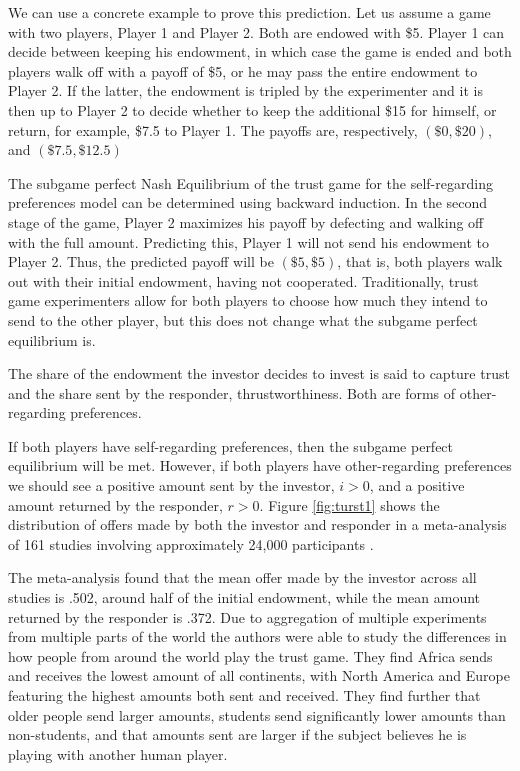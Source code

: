 \documentclass[12pt]{article}
\begin{document}
We can use a concrete example to prove this prediction. Let us assume a game with two players, Player 1 and Player 2. Both are endowed with \$5. Player 1 can decide between keeping his endowment, in which case the game is ended and both players walk off with a payoff of \$5, or he may pass the entire endowment to Player 2. If the latter, the endowment is tripled by the experimenter and it is then up to Player 2 to decide whether to keep the additional \$15 for himself, or return, for example, \$7.5 to Player 1. The payoffs are, respectively, $\left( \$ 0, \$20 \right)$, and  $\left( \$ 7.5, \$12.5 \right)$

The subgame perfect Nash Equilibrium of the trust game for the self-regarding preferences model can be determined using backward induction. In the second stage of the game, Player 2 maximizes his payoff by defecting and walking off with the full amount. Predicting this, Player 1 will not send his endowment to Player 2. Thus, the predicted payoff will be $\left (\$5,\$5 \right)$, that is, both players walk out with their initial endowment, having not cooperated. Traditionally, trust game experimenters allow for both players to choose how much they intend to send to the other player, but this does not change what the subgame perfect equilibrium is. 

The share of the endowment the investor decides to invest is said to capture trust and the share sent by the responder, thrustworthiness. Both are forms of other-regarding preferences.

If both players have self-regarding preferences, then the subgame perfect equilibrium will be met. However, if both players have other-regarding preferences we should see a positive amount sent by the investor, $i>0$, and a positive amount returned by the responder, $r>0$. Figure \ref{fig:turst1} shows the distribution of offers made by both the investor and responder in a meta-analysis of 161 studies involving approximately 24,000 participants \citep{Johnson2011}.

The meta-analysis found that the mean offer made by the investor across all studies is .502, around half of the initial endowment, while the mean amount returned by the responder is .372. Due to aggregation of multiple experiments from multiple parts of the world the authors were able to study the differences in how people from around the world play the trust game. They find Africa sends and receives the lowest amount of all continents, with North America and Europe featuring the highest amounts both sent and received. They find further that older people send larger amounts, students send significantly lower amounts than non-students, and that amounts sent are larger if the subject believes he is playing with another human player. 
\\
\end{document}
